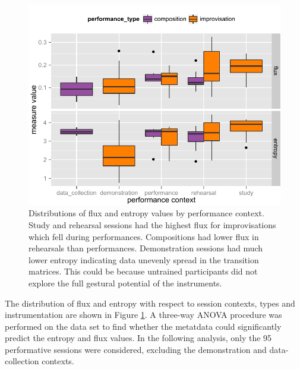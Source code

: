 \documentclass{sigchi}
\begin{document}
\begin{figure}
  \centering
  \includegraphics[width=\linewidth]{figures/context-flux-entropy-boxplot}
  \caption{Distributions of flux and entropy values by performance context. Study
    and rehearsal sessions had the highest flux for improvisations
    which fell during performances. Compositions had lower flux in
    rehearsals than performances. Demonstration sessions had much lower entropy
  indicating data unevenly spread in the transition matrices. This
  could be because untrained
  participants did not explore the full gestural potential of the
  instruments. 
  \label{fig:flux-entropy-boxplot}}
\end{figure}


The distribution of flux and entropy with respect to session contexts,
types and instrumentation are shown in Figure
\ref{fig:flux-entropy-boxplot}. A three-way ANOVA procedure was
performed on the data set to find whether the metatdata could
significantly predict the entropy and flux values.
In the following analysis, only the 95 performative sessions were
considered, excluding the demonstration and data-collection contexts.
\end{document}
